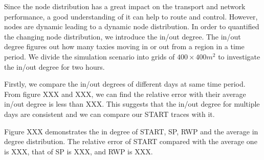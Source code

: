 Since the node distribution has a great impact on the transport and network performance, a good understanding of it can help to route and control.  However, nodes are dynamic leading to a dynamic node distribution. In order to quantified the changing node distribution,  we introduce the in/out degree. The in/out degree figures out how many taxies moving in or out from a region in a time period. 
We divide the simulation scenario into grids of $ 400\times 400 m^2$ to investigate the in/out degree for two hours. 

Firstly, we compare the in/out degrees of different days at same time period. From figure XXX and XXX, we can find the relative error with their average in/out degree is less than XXX. This suggests     that the in/out degree for multiple days are consistent and we can compare our START traces with it.

Figure XXX demonstrates the in degree of START, SP, RWP and the average in degree distribution. The relative error of START compared with the average one is XXX, that of SP is XXX,  and RWP is XXX.



